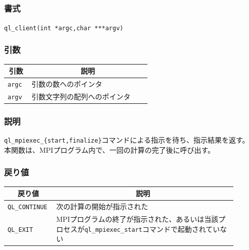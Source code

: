\documentclass[twoside,11pt,fleqn]{book}
\begin{document}
\subsection{}
\subsubsection*{書式}{\quad} \texttt{ql\_client(int *argc,char ***argv)}
\subsubsection*{引数}{\quad}
\begin{table}[!ht]
\footnotesize
\begin{tabular}{|p{0.15\linewidth}|p{0.75\linewidth}|} \hline
\multicolumn{1}{|c}{\textbf{引数}}&\multicolumn{1}{|c|}{\textbf{説明}}\\ \hline \hline
\texttt{argc}&引数の数へのポインタ\\ \hline
\texttt{argv}&引数文字列の配列へのポインタ\\ \hline
\end{tabular}
\vspace{-0em}
\end{table}
\subsubsection*{説明}{\quad}
\texttt{ql\_mpiexec\_\{start,finalize\}}コマンドによる指示を待ち、指示結果を返す。
本関数は、MPIプログラム内で、一回の計算の完了後に呼び出す。

\subsubsection*{戻り値}{\quad}
\begin{table}[!ht]
\footnotesize
\begin{tabular}{|p{0.15\linewidth}|p{0.75\linewidth}|} \hline
\multicolumn{1}{|c}{\textbf{戻り値}}&\multicolumn{1}{|c|}{\textbf{説明}}\\ \hline \hline
\texttt{\texttt{QL\_CONTINUE}}&次の計算の開始が指示された\\ \hline
\texttt{\texttt{QL\_EXIT}}&MPIプログラムの終了が指示された、あるいは当該プロセスが\texttt{ql\_mpiexec\_start}コマンドで起動されていない\\ \hline
\end{tabular}
\vspace{-0em}
\end{table}
\end{document}
